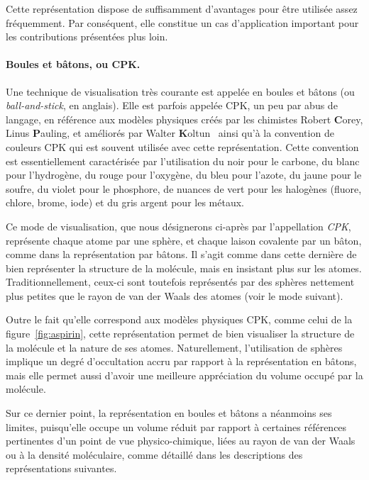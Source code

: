 	Cette représentation dispose de suffisamment d'avantages pour être utilisée assez fréquemment. Par conséquent, elle constitue un cas d'application important pour les contributions présentées plus loin.
		
	\paragraph{Boules et bâtons, ou CPK.} Une technique de visualisation très courante est appelée \og en boules et bâtons \fg{} (ou \emph{ball-and-stick}, en anglais). Elle est parfois appelée CPK, un peu par abus de langage, en référence aux modèles physiques créés par les chimistes Robert \textbf{C}orey, Linus \textbf{P}auling, et améliorés par Walter \textbf{K}oltun~\cite{corey1953molecular, koltun1965space} ainsi qu'à la convention de couleurs CPK qui est souvent utilisée avec cette représentation. Cette convention est essentiellement caractérisée par l'utilisation du noir pour le carbone, du blanc pour l'hydrogène, du rouge pour l'oxygène, du bleu pour l'azote, du jaune pour le soufre, du violet pour le phosphore, de nuances de vert pour les halogènes (fluore, chlore, brome, iode) et du gris argent pour les métaux.
		
	Ce mode de visualisation, que nous désignerons ci-après par l'appellation \emph{CPK}, représente chaque atome par une sphère, et chaque laison covalente par un bâton, comme dans la représentation par bâtons. Il s'agit comme dans cette dernière de bien représenter la structure de la molécule, mais en insistant plus sur les atomes. Traditionnellement, ceux-ci sont toutefois représentés par des sphères nettement plus petites que le rayon de van der Waals des atomes (voir le mode suivant).
		
	Outre le fait qu'elle correspond aux modèles physiques CPK, comme celui de la figure~\ref{fig:aspirin}, cette représentation permet de bien visualiser la structure de la molécule et la nature de ses atomes. Naturellement, l'utilisation de sphères implique un degré d'occultation accru par rapport à la représentation en bâtons, mais elle permet aussi d'avoir une meilleure appréciation du volume occupé par la molécule.
		
	Sur ce dernier point, la représentation en boules et bâtons a néanmoins ses limites, puisqu'elle occupe un volume réduit par rapport à certaines références pertinentes d'un point de vue physico-chimique, liées au rayon de van der Waals ou à la densité moléculaire, comme détaillé dans les descriptions des représentations suivantes.
		
